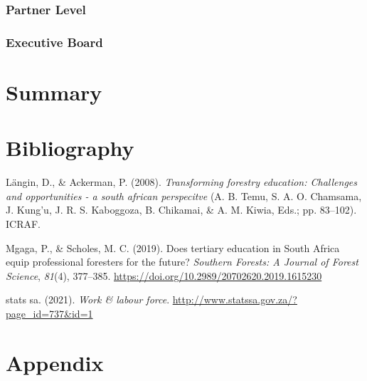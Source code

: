 \documentclass[
  11pt,
]{article}
\newlength{\cslhangindent}
\newenvironment{CSLReferences}[2] %
 {%
  \setlength{\parindent}{0pt}
  \ifodd #1 \everypar{\setlength{\hangindent}{\cslhangindent}}\ignorespaces\fi
  \ifnum #2 > 0
  \setlength{\parskip}{#2\baselineskip}
  \fi
 }%
 {}
\begin{document}
\hypertarget{partner-level}{%
\subsubsection{Partner Level}\label{partner-level}}

\hypertarget{executive-board}{%
\subsubsection{Executive Board}\label{executive-board}}

\clearpage

\hypertarget{summary}{%
\section{Summary}\label{summary}}

\clearpage

\hypertarget{bibliography}{%
\section{Bibliography}\label{bibliography}}

\hypertarget{refs}{}
\begin{CSLReferences}{1}{0}
\leavevmode{}%
Längin, D., \& Ackerman, P. (2008). \emph{Transforming forestry
education: Challenges and opportunities - a south african perspecitve}
(A. B. Temu, S. A. O. Chamsama, J. Kung'u, J. R. S. Kaboggoza, B.
Chikamai, \& A. M. Kiwia, Eds.; pp. 83--102). ICRAF.

\leavevmode{}%
Mgaga, P., \& Scholes, M. C. (2019). Does tertiary education in {South
Africa} equip professional foresters for the future? \emph{Southern
Forests: A Journal of Forest Science}, \emph{81}(4), 377--385.
\url{https://doi.org/10.2989/20702620.2019.1615230}

\leavevmode{}%
stats sa. (2021). \emph{Work \& labour force}.
\url{http://www.statssa.gov.za/?page_id=737\&id=1}

\end{CSLReferences}

\clearpage

\hypertarget{appendix}{%
\section{Appendix}\label{appendix}}
\end{document}
